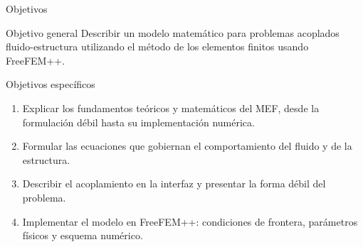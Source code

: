 \titleframe


\begin{frame}{Objetivos}
  \begin{block}{Objetivo general}
    Describir un modelo matemático para problemas acoplados fluido-estructura utilizando el método de los elementos finitos usando FreeFEM++.
  \end{block}
  \vspace{0.3em}
  \begin{exampleblock}{Objetivos específicos}
    \begin{enumerate}
      \item Explicar los fundamentos teóricos y matemáticos del MEF, desde la formulación débil hasta su implementación numérica.
      \item Formular las ecuaciones que gobiernan el comportamiento del fluido y de la estructura.
      \item Describir el acoplamiento en la interfaz y presentar la forma débil del problema.
      \item Implementar el modelo en FreeFEM++: condiciones de frontera, parámetros físicos y esquema numérico.
    \end{enumerate}
  \end{exampleblock}
\end{frame}



